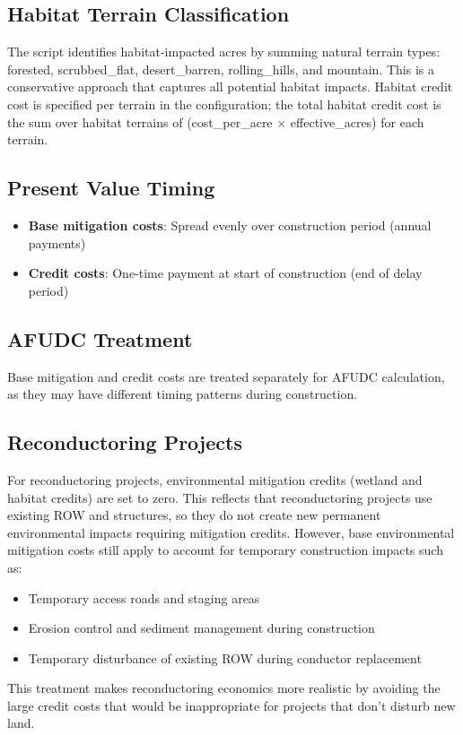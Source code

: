 \documentclass[ctcc_full_documentation.tex]{subfiles}
\begin{document}
\subsection{Habitat Terrain Classification}

The script identifies habitat-impacted acres by summing natural terrain types: forested, scrubbed\_flat, desert\_barren, rolling\_hills, and mountain. This is a conservative approach that captures all potential habitat impacts. Habitat credit cost is specified per terrain in the configuration; the total habitat credit cost is the sum over habitat terrains of (cost\_per\_acre $\times$ effective\_acres) for each terrain.

\subsection{Present Value Timing}

\begin{itemize}
    \item \textbf{Base mitigation costs}: Spread evenly over construction period (annual payments)
    \item \textbf{Credit costs}: One-time payment at start of construction (end of delay period)
\end{itemize}

\subsection{AFUDC Treatment}

Base mitigation and credit costs are treated separately for AFUDC calculation, as they may have different timing patterns during construction.

\subsection{Reconductoring Projects}

For reconductoring projects, environmental mitigation credits (wetland and habitat credits) are set to zero. This reflects that reconductoring projects use existing ROW and structures, so they do not create new permanent environmental impacts requiring mitigation credits. However, base environmental mitigation costs still apply to account for temporary construction impacts such as:
\begin{itemize}
    \item Temporary access roads and staging areas
    \item Erosion control and sediment management during construction
    \item Temporary disturbance of existing ROW during conductor replacement
\end{itemize}

This treatment makes reconductoring economics more realistic by avoiding the large credit costs that would be inappropriate for projects that don't disturb new land.
\end{document}
